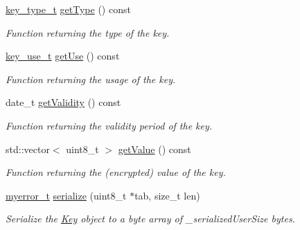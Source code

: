 \begin{DoxyCompactItemize}
\hyperlink{key_8hpp_a4f367c350737c92475175fb229c5570e}{key\+\_\+type\+\_\+t} \hyperlink{classKey_a0f29c5a6e944fd888f42fa4791a91acd}{get\+Type} () const 
\begin{DoxyCompactList}\small\item\em Function returning the type of the key. \end{DoxyCompactList}\item 
\hyperlink{key_8hpp_a82f88f5cef6b287c45bd2fbb36879c3e}{key\+\_\+use\+\_\+t} \hyperlink{classKey_a8f28fd26ad3090f3cf569896bb8be14a}{get\+Use} () const 
\begin{DoxyCompactList}\small\item\em Function returning the usage of the key. \end{DoxyCompactList}\item 
date\+\_\+t \hyperlink{classKey_a8a25398fcae6bdb827c4ff235ffef471}{get\+Validity} () const 
\begin{DoxyCompactList}\small\item\em Function returning the validity period of the key. \end{DoxyCompactList}\item 
std\+::vector$<$ uint8\+\_\+t $>$ \hyperlink{classKey_adbefc25c5016e7e392cbee865039a7d0}{get\+Value} () const 
\begin{DoxyCompactList}\small\item\em Function returning the (encrypted) value of the key. \end{DoxyCompactList}\item 
\hypertarget{classKey_afbb4dc3961f1a5b9cfb41a03a609d937}{}\hyperlink{error_8hpp_acabd2917084445509becf54ab64a4bd0}{myerror\+\_\+t} \hyperlink{classKey_afbb4dc3961f1a5b9cfb41a03a609d937}{serialize} (uint8\+\_\+t $\ast$tab, size\+\_\+t len)\label{classKey_afbb4dc3961f1a5b9cfb41a03a609d937}

\begin{DoxyCompactList}\small\item\em Serialize the \hyperlink{classKey}{Key} object to a byte array of {\itshape \+\_\+serialized\+User\+Size} bytes. \end{DoxyCompactList}\end{DoxyCompactItemize}
